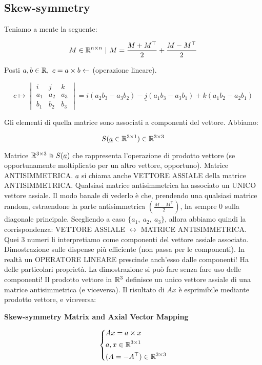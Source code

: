 \subsection{Skew-symmetry}

Teniamo a mente la seguente:

\[	
	M\in\mathbb{R}^{n\times n}\ |\ M = \frac{M+M^\top}{2} + \frac{M-M^\top}{2}
\]

Posti $a,b\in\mathbb{R},\ c=a\times b \leftarrow$ (operazione lineare). 

\[
	c\mapsto \begin{vmatrix}i&j&k\\a_1&a_2&a_3\\b_1&b_2&b_3\end{vmatrix} = \underline{i}(a_2b_3 - a_3b_2) - \underline{j}(a_1b_3 - a_3b_1) + \underline{k}(a_1b_2 - a_2b_1)
\]

Gli elementi di quella matrice sono associati a componenti del vettore. Abbiamo:

\[
	S(\underline{a}\in\mathbb{R}^{3\times 1})\in\mathbb{R}^{3\times 3}
\]

Matrice $\mathbb{R}^{3\times 3} \ni S(\underline{a})$ che rappresenta l'operazione di prodotto vettore (se opportunamente moltiplicato per un altro vettore, opportuno). Matrice ANTISIMMETRICA. $\underline{a}$ si chiama anche VETTORE ASSIALE della matrice ANTISIMMETRICA. Qualsiasi matrice antisimmetrica ha associato un UNICO vettore assiale. Il modo banale di vederlo è che, prendendo una qualsiasi matrice random, estraendone la parte antisimmetrica $(\frac{M-M^\top}{2})$, ha sempre 0 sulla diagonale principale. Scegliendo a caso $\{a_1,\ a_2,\ a_3\}$, allora abbiamo quindi la corrispondenza: VETTORE ASSIALE $\leftrightarrow$ MATRICE ANTISIMMETRICA. Quei 3 numeri li interpretiamo come componenti del vettore assiale associato. Dimostrazione sulle dispense più efficiente (non passa per le componenti). In realtà un OPERATORE LINEARE prescinde anch'esso dalle componenti! Ha delle particolari proprietà. La dimostrazione si può fare senza fare uso delle componenti! Il prodotto vettore in $\mathbb{R}^3$ definisce un unico vettore assiale di una matrice antisimmetrica (e viceversa). Il risultato di $Ax$ è esprimibile mediante prodotto vettore, e viceversa:

\begin{thrm}{\textbf{Skew-symmetry Matrix and Axial Vector Mapping}}

\[
	\left\{
	\begin{aligned}
	&Ax = a\times x\\
	&a,x\in\mathbb{R}^{3\times 1}\\
	&(A=-A^\top)\in\mathbb{R}^{3\times 3}
	\end{aligned}
	\right.
\]

\end{thrm}

